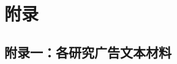\chapter*{附录}

\pagestyle{supplementary}     %
\thispagestyle{supplementary} %

\setlength{\parindent}{0pt}  %

\section*{附录一：各研究广告文本材料}


\newcommand{\longtablesongti}{\CJKfamily{song}\fontsize{9pt}{9pt}\selectfont}
\renewcommand{\arraystretch}{1} %

